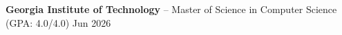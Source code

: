 \textbf{Georgia Institute of Technology} -- Master of Science in Computer Science (GPA: 4.0/4.0) \hfill Jun 2026 \\